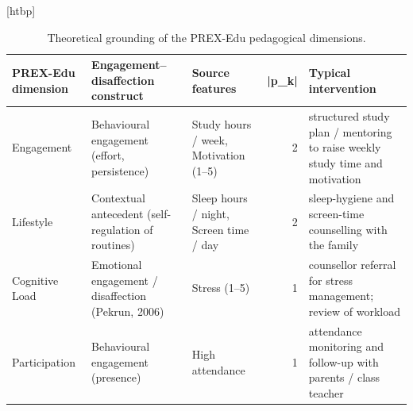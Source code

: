 \begin{table}
\small[htbp]
\caption{Theoretical grounding of the PREX-Edu pedagogical dimensions.}
\label{tab:T01_prex_dimensions}
\begin{tabular}{lllrl}
\toprule
PREX-Edu dimension & Engagement–disaffection construct & Source features & |p\_k| & Typical intervention \\
\midrule
Engagement & Behavioural engagement (effort, persistence) & Study hours / week, Motivation (1–5) & 2 & structured study plan / mentoring to raise weekly study time and motivation \\
Lifestyle & Contextual antecedent (self-regulation of routines) & Sleep hours / night, Screen time / day & 2 & sleep-hygiene and screen-time counselling with the family \\
Cognitive Load & Emotional engagement / disaffection (Pekrun, 2006) & Stress (1–5) & 1 & counsellor referral for stress management; review of workload \\
Participation & Behavioural engagement (presence) & High attendance & 1 & attendance monitoring and follow-up with parents / class teacher \\
\bottomrule
\end{tabular}
\end{table}

